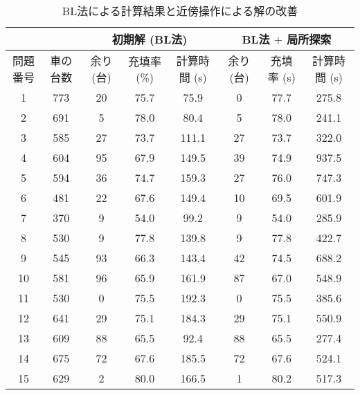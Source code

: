 \begin{table}[H]
        \centering
        \caption{BL法による計算結果と近傍操作による解の改善}
        \label{review-local}
        \begin{tabular}{cccccccc}
        \hline
        & & \multicolumn{3}{c}{初期解 (BL法)} & \multicolumn{3}{c}{BL法 $+$ 局所探索} \\
        \hline
        問題番号 & 車の台数  & 余り (台)  & 充填率 (\%) & 計算時間 (s) & 余り (台)  & 充填率 (s)  & 計算時間 (s)  \\
        \hline
        1    & 773  & 20      & 75.7     & 75.9     & 0       &  77.7    & 275.8     \\
        2    & 691  & 5       & 78.0     & 80.4     & 5       &  78.0    & 241.1     \\
        3    & 585  & 27      & 73.7     & 111.1    & 27      &  73.7    & 322.0     \\
        4    & 604  & 95      & 67.9     & 149.5    & 39      &  74.9    & 937.5     \\
        5    & 594  & 36      & 74.7     & 159.3    & 27      &  76.0    & 747.3     \\
        6    & 481  & 22      & 67.6     & 149.4    & 10      &  69.5    & 601.9     \\
        7    & 370  & 9       & 54.0     & 99.2     & 9       &  54.0    & 285.9     \\
        8    & 530  & 9       & 77.8     & 139.8    & 9       &  77.8    & 422.7     \\
        9    & 545  & 93      & 66.3     & 143.4    & 42      &  74.5    & 688.2     \\
        10   & 581  & 96      & 65.9     & 161.9    & 87      &  67.0    & 548.9     \\
        11   & 530  & 0       & 75.5     & 192.3    & 0       &  75.5    & 385.6     \\
        12   & 641  & 29      & 75.1     & 184.3    & 29      &  75.1    & 550.9     \\
        13   & 609  & 88      & 65.5     & 92.4     & 88      &  65.5    & 277.4     \\
        14   & 675  & 72      & 67.6     & 185.5    & 72      &  67.6    & 524.1     \\
        15   & 629  & 2       & 80.0     & 166.5    & 1       &  80.2    & 517.3     \\
        \hline
        \end{tabular}
\end{table}

